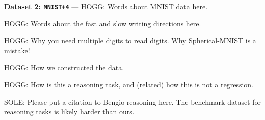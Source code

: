 \documentclass{article}
\renewcommand{\paragraph}[1]{\par\medskip\noindent\textbf{#1} ---}
\begin{document}
\paragraph{Dataset 2: \texttt{MNIST+4}}
HOGG: Words about MNIST data here.

HOGG: Words about the fast and slow writing directions here.

HOGG: Why you need multiple digits to read digits. Why Spherical-MNIST is a mistake!

HOGG: How we constructed the data.

HOGG: How is this a reasoning task, and (related) how this is not a regression.

SOLE: Please put a citation to Bengio reasoning here. 
The benchmark dataset for reasoning tasks \cite{zhang2021pointer} is likely harder than ours. 
\end{document}
